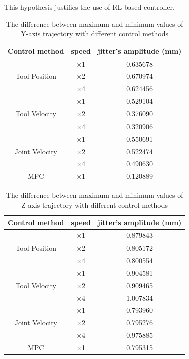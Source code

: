 This hypothesis justifies the use of \acs {RL}-based controller.

\begin{table}[h]
	\centering
	\caption{The difference between maximum and minimum values of Y-axis trajectory with different control methods}
	\begin{tabular}{|c|c|c|}
		\hline
		Control method & speed & jitter's amplitude (mm) \\
		\hline		
		& $ \times $1 & 0.635678\\
		Tool Position & $ \times $2 & 0.670974\\
		& $ \times $4 & 0.624456\\
		\hline		
		& $ \times $1 & 0.529104\\
		Tool Velocity & $ \times $2 & 0.376090\\
		& $ \times $4 & 0.320906\\
		\hline		
		& $ \times $1 & 0.550691\\
		Joint Velocity & $ \times $2 & 0.522474\\
		& $ \times $4 & 0.490630\\				
		\hline
		\acs {MPC} & $ \times $1 & 0.120889 \\
		\hline

	\end{tabular}
	\label{tab:y_jitter}
\end{table}

\begin{table}
	\centering
	\caption{The difference between maximum and minimum values of Z-axis trajectory with different control methods}
	\begin{tabular}{|c|c|c|}
		\hline
		Control method & speed & jitter's amplitude (mm) \\
		\hline		
		& $ \times $1 & 0.879843\\
		Tool Position & $ \times $2 & 0.805172\\
		& $ \times $4 & 0.800554\\
		\hline		
		& $ \times $1 & 0.904581\\
		Tool Velocity & $ \times $2 & 0.909465\\
		& $ \times $4 & 1.007834\\
		\hline		
		& $ \times $1 & 0.793960\\
		Joint Velocity & $ \times $2 & 0.795276\\
		& $ \times $4 & 0.975885\\				
		\hline
		\acs {MPC} & $ \times $1 & 0.795315 \\
		\hline
		
	\end{tabular}
	\label{tab:z_jitter}
\end{table}

